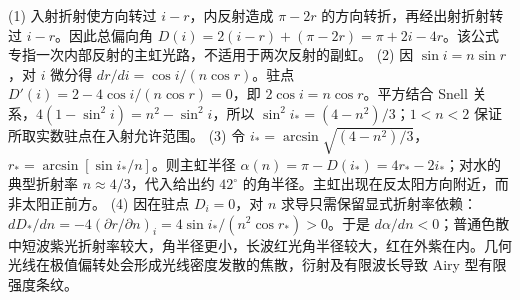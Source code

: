 (1) 入射折射使方向转过 \(i-r\)，内反射造成 \(\pi-2r\) 的方向转折，再经出射折射转过 \(i-r\)。因此总偏向角 \(D(i)=2(i-r)+(\pi-2r)=\pi+2i-4r\)。该公式专指一次内部反射的主虹光路，不适用于两次反射的副虹。
(2) 因 \(\sin i=n\sin r\)，对 \(i\) 微分得 \(dr/di=\cos i/(n\cos r)\)。驻点 \(D'(i)=2-4\cos i/(n\cos r)=0\)，即 \(2\cos i=n\cos r\)。平方结合 Snell 关系，\(4(1-\sin^2 i)=n^2-\sin^2 i\)，所以 \(\sin^2 i_*=(4-n^2)/3\)；\(1<n<2\) 保证所取实数驻点在入射允许范围。
(3) 令 \(i_*=\arcsin\sqrt{(4-n^2)/3}\)，\(r_*=\arcsin[\sin i_*/n]\)。则主虹半径 \(\alpha(n)=\pi-D(i_*)=4r_*-2i_*\)；对水的典型折射率 \(n\approx4/3\)，代入给出约 \(42^\circ\) 的角半径。主虹出现在反太阳方向附近，而非太阳正前方。
(4) 因在驻点 \(D_i=0\)，对 \(n\) 求导只需保留显式折射率依赖：\(dD_*/dn=-4(\partial r/\partial n)_i=4\sin i_*/(n^2\cos r_*)>0\)。于是 \(d\alpha/dn<0\)；普通色散中短波紫光折射率较大，角半径更小，长波红光角半径较大，红在外紫在内。几何光线在极值偏转处会形成光线密度发散的焦散，衍射及有限波长导致 Airy 型有限强度条纹。
